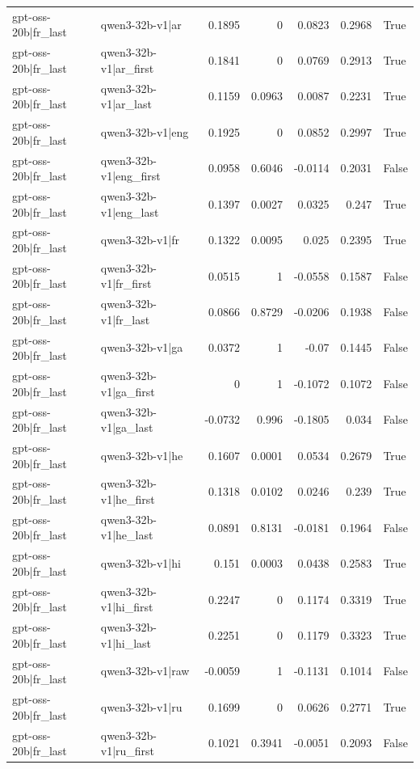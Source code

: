\begin{table}
\begin{tabular}{l l r r r r l}
gpt-oss-20b|fr_last & qwen3-32b-v1|ar & 0.1895 & 0 & 0.0823 & 0.2968 & True \\
gpt-oss-20b|fr_last & qwen3-32b-v1|ar_first & 0.1841 & 0 & 0.0769 & 0.2913 & True \\
gpt-oss-20b|fr_last & qwen3-32b-v1|ar_last & 0.1159 & 0.0963 & 0.0087 & 0.2231 & True \\
gpt-oss-20b|fr_last & qwen3-32b-v1|eng & 0.1925 & 0 & 0.0852 & 0.2997 & True \\
gpt-oss-20b|fr_last & qwen3-32b-v1|eng_first & 0.0958 & 0.6046 & -0.0114 & 0.2031 & False \\
gpt-oss-20b|fr_last & qwen3-32b-v1|eng_last & 0.1397 & 0.0027 & 0.0325 & 0.247 & True \\
gpt-oss-20b|fr_last & qwen3-32b-v1|fr & 0.1322 & 0.0095 & 0.025 & 0.2395 & True \\
gpt-oss-20b|fr_last & qwen3-32b-v1|fr_first & 0.0515 & 1 & -0.0558 & 0.1587 & False \\
gpt-oss-20b|fr_last & qwen3-32b-v1|fr_last & 0.0866 & 0.8729 & -0.0206 & 0.1938 & False \\
gpt-oss-20b|fr_last & qwen3-32b-v1|ga & 0.0372 & 1 & -0.07 & 0.1445 & False \\
gpt-oss-20b|fr_last & qwen3-32b-v1|ga_first & 0 & 1 & -0.1072 & 0.1072 & False \\
gpt-oss-20b|fr_last & qwen3-32b-v1|ga_last & -0.0732 & 0.996 & -0.1805 & 0.034 & False \\
gpt-oss-20b|fr_last & qwen3-32b-v1|he & 0.1607 & 0.0001 & 0.0534 & 0.2679 & True \\
gpt-oss-20b|fr_last & qwen3-32b-v1|he_first & 0.1318 & 0.0102 & 0.0246 & 0.239 & True \\
gpt-oss-20b|fr_last & qwen3-32b-v1|he_last & 0.0891 & 0.8131 & -0.0181 & 0.1964 & False \\
gpt-oss-20b|fr_last & qwen3-32b-v1|hi & 0.151 & 0.0003 & 0.0438 & 0.2583 & True \\
gpt-oss-20b|fr_last & qwen3-32b-v1|hi_first & 0.2247 & 0 & 0.1174 & 0.3319 & True \\
gpt-oss-20b|fr_last & qwen3-32b-v1|hi_last & 0.2251 & 0 & 0.1179 & 0.3323 & True \\
gpt-oss-20b|fr_last & qwen3-32b-v1|raw & -0.0059 & 1 & -0.1131 & 0.1014 & False \\
gpt-oss-20b|fr_last & qwen3-32b-v1|ru & 0.1699 & 0 & 0.0626 & 0.2771 & True \\
gpt-oss-20b|fr_last & qwen3-32b-v1|ru_first & 0.1021 & 0.3941 & -0.0051 & 0.2093 & False \\

\end{tabular}
\end{table}
